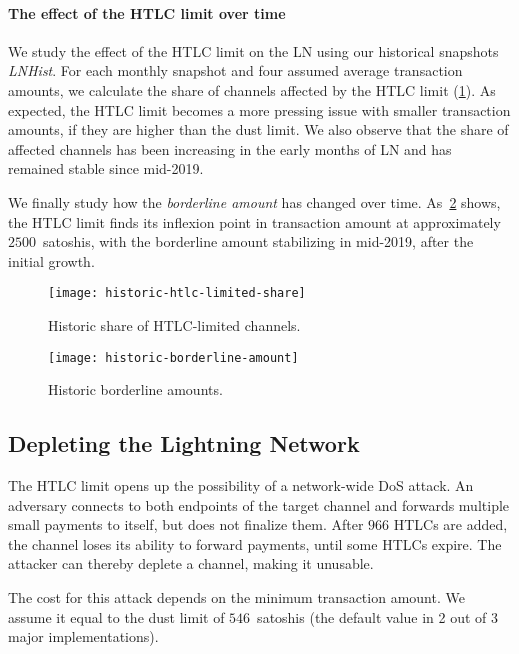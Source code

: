 \paragraph{The effect of the HTLC limit over time}

We study the effect of the HTLC limit on the LN using our historical snapshots \emph{LNHist}.
For each monthly snapshot and four assumed average transaction amounts, we calculate the share of channels affected by the HTLC limit (\cref{fig:historic-htlc-limited-share}).
As expected, the HTLC limit becomes a more pressing issue 
with smaller transaction amounts, if they are higher than the dust limit.
We also observe that the share of affected channels has been increasing in the early months of LN and has remained stable since mid-2019.

We finally study how the \textit{borderline amount} has changed over time.
As~\cref{fig:historic-borderline-amount} shows, the HTLC limit finds 
its inflexion point in transaction amount at approximately $2500$~satoshis, with the borderline amount stabilizing in mid-2019, after the initial growth.

\begin{figure}[tb]
	\centering
	\texttt{[image: historic-htlc-limited-share]}
	\caption{Historic share of HTLC-limited channels.\label{fig:historic-htlc-limited-share}}
\end{figure}

\begin{figure}[tb]
	\centering
	\texttt{[image: historic-borderline-amount]}
	\caption{Historic borderline amounts.\label{fig:historic-borderline-amount}}
\end{figure}



\subsection{Depleting the Lightning Network}

The HTLC limit opens up the possibility of a network-wide DoS attack.
An adversary connects to both endpoints of the target channel and forwards multiple small payments to itself, 
but does not finalize them.
After $966$ HTLCs are added, the channel loses its ability to forward payments, until some HTLCs expire. 
The attacker can thereby deplete a channel, making it unusable.

The cost for this attack depends on the minimum transaction amount.
We assume it equal to the dust limit of $546$~satoshis (the default value in 2 out of 3 major implementations).

